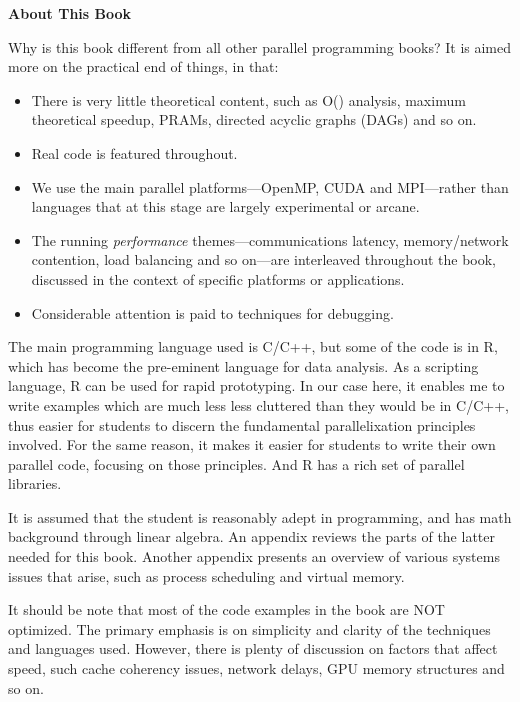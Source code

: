 \newpage

\begin{center}
{\bf \large About This Book}
\end{center}

Why is this book different from all other parallel programming books?
It is aimed more on the practical end of things, in that:

\begin{itemize}

\item There is very little theoretical content, such as O() analysis,
maximum theoretical speedup, PRAMs, directed acyclic graphs (DAGs) and so on.

\item Real code is featured throughout. 

\item We use the main parallel platforms---OpenMP, CUDA and MPI---rather
than languages that at this stage are largely experimental or arcane. 

\item The running {\it performance} themes---communications latency,
memory/network contention, load balancing and so on---are interleaved
throughout the book, discussed in the context of specific platforms or
applications.

\item Considerable attention is paid to techniques for debugging.

\end{itemize}

The main programming language used is C/C++, but some of the code is in
R, which has become the pre-eminent language for data analysis.  As a
scripting language, R can be used for rapid prototyping.  In our case
here, it enables me to write examples which are much less less cluttered
than they would be in C/C++, thus easier for students to discern the
fundamental parallelixation principles involved.  For the same reason,
it makes it easier for students to write their own parallel code,
focusing on those principles.  And R has a rich set of parallel
libraries.

It is assumed that the student is reasonably adept in programming, and
has math background through linear algebra.  An appendix reviews the
parts of the latter needed for this book.  Another appendix presents an
overview of various systems issues that arise, such as process
scheduling and virtual memory.

It should be note that most of the code examples in the book are NOT
optimized.  The primary emphasis is on simplicity and clarity of the
techniques and languages used.  However, there is plenty of discussion
on factors that affect speed, such cache coherency issues, network
delays, GPU memory structures and so on.


